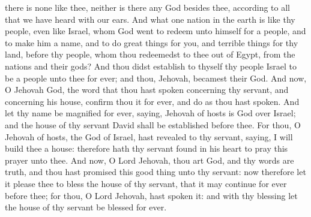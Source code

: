 there is none like thee, neither is there any God besides thee, according to all that we have heard with our ears. And what one nation in the earth is like thy people, even like Israel, whom God went to redeem unto himself for a people, and to make him a name, and to do great things for you, and terrible things for thy land, before thy people, whom thou redeemedst to thee out of Egypt, from the nations and their gods? And thou didst establish to thyself thy people Israel to be a people unto thee for ever; and thou, Jehovah, becamest their God. And now, O Jehovah God, the word that thou hast spoken concerning thy servant, and concerning his house, confirm thou it for ever, and do as thou hast spoken. And let thy name be magnified for ever, saying, Jehovah of hosts is God over Israel; and the house of thy servant David shall be established before thee. For thou, O Jehovah of hosts, the God of Israel, hast revealed to thy servant, saying, I will build thee a house: therefore hath thy servant found in his heart to pray this prayer unto thee. And now, O Lord Jehovah, thou art God, and thy words are truth, and thou hast promised this good thing unto thy servant: now therefore let it please thee to bless the house of thy servant, that it may continue for ever before thee; for thou, O Lord Jehovah, hast spoken it: and with thy blessing let the house of thy servant be blessed for ever. 

